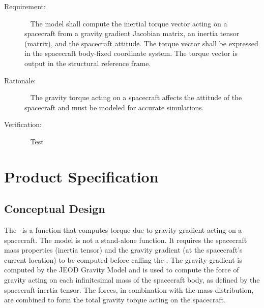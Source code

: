 \label{reqt:gravity_torque}
\begin{description}
\item[Requirement:]\ \newline
The model shall compute the inertial torque vector acting on a spacecraft from 
a gravity gradient Jacobian matrix, an inertia tensor (matrix), and
the spacecraft attitude.
   \subrequirement{}
   The torque vector shall be expressed in the spacecraft body-fixed coordinate system.
The torque vector is output in the structural reference frame.
\item[Rationale:]\ \newline
The gravity torque acting on a spacecraft affects the attitude of the spacecraft
and must be modeled for accurate simulations.
\item[Verification:]\ \newline
Test
\end{description}

%
%      
%   
%
%


\chapter{Product Specification}\label{ch:spec}

\section{Conceptual Design}
The \gravitytorqueDesc\ is a function that computes torque
due to gravity gradient acting on a spacecraft. The model is not a stand-alone 
function. It requires the spacecraft mass properties (inertia tensor) and the 
gravity gradient (at the spacecraft's current location) to be computed
before calling the \gravitytorqueDesc. The gravity gradient is computed
by the JEOD Gravity Model and is used
to compute the force of gravity acting on each infinitesimal mass of the
spacecraft body, as defined by the spacecraft inertia tensor. 
The forces, in combination with the mass distribution,
are combined to form the total gravity torque acting on the spacecraft.

